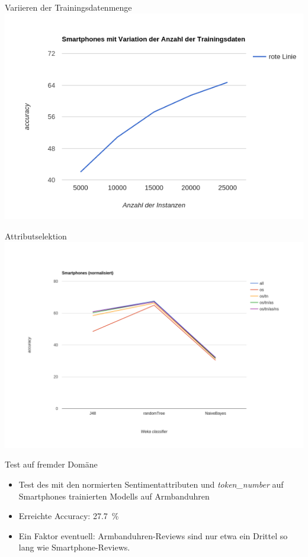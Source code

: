 \documentclass[note=hide]{beamer} %
\newcommand{\feature}[1]{\textcolor{dunkelrot}{\emph{#1}}}
\begin{document}
\begin{frame}{Variieren der Trainingsdatenmenge}
	\includegraphics[width=\framewidth]{accuracy_smartphones_normalized_trainsize.png}
\end{frame}

\begin{frame}{Attributselektion}
	\includegraphics[width=\framewidth]{accuracy_smartphones_normalized.png}
\end{frame}

\begin{frame}{Test auf fremder Domäne}

	\begin{itemize}
		\item Test des mit den normierten Sentimentattributen und \feature{token\_number} auf Smartphones trainierten Modells auf Armbanduhren
		\item Erreichte Accuracy: \SI{27.7}{\%}
		\item Ein Faktor eventuell: Armbanduhren-Reviews sind nur etwa ein Drittel so lang wie Smartphone-Reviews.
	\end{itemize}
\end{frame}
\end{document}
